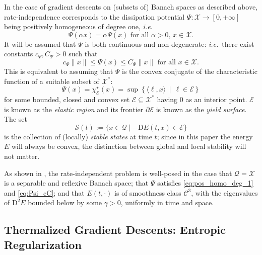 \documentclass[reqno]{amsart}
\theoremstyle{definition}
\begin{document}
In the case of gradient descents on (subsets of) Banach spaces as described above, rate-independence corresponds to the dissipation potential $\Psi \colon \mathcal{X} \to [0, +\infty]$ being positively homogeneous of degree one, \emph{i.e.}
\begin{equation}
	\label{eq:pos_homo_deg_1}
	\Psi(\alpha x) = \alpha \Psi(x) \text{ for all $\alpha > 0$, $x \in \mathcal{X}$.}
\end{equation}
It will be assumed that $\Psi$ is both continuous and non-degenerate:  \emph{i.e.}\ there exist constants $c_{\Psi}, C_{\Psi} > 0$ such that
\begin{equation}
	\label{eq:Psi_cC}
	c_{\Psi} \| x \| \leq \Psi(x) \leq C_{\Psi} \| x \| \text{ for all } x \in \mathcal{X}.
\end{equation}
This is equivalent to assuming that $\Psi$ is the convex conjugate of the characteristic function of a suitable subset of $\mathcal{X}^{\ast}$:
\begin{equation}
	\label{eq:DissElas}
	\Psi(x) = \chi_{\mathcal{E}}^{\star} (x) = \sup \left\{ \langle \ell, x \rangle \,\middle|\, \ell \in {\mathcal{E}} \right\}
\end{equation}
for some bounded, closed and convex set ${\mathcal{E}} \subseteq \mathcal{X}^{\ast}$ having $0$ as an interior point.  ${\mathcal{E}}$ is known as the \emph{elastic region} and its frontier $\partial {\mathcal{E}}$ is known as the \emph{yield surface}.  The set
\begin{equation}
	\label{eq:stable}
	{\mathcal{S}}(t) := \{ x \in \mathcal{Q} \mid - {\mathrm{D}} E(t, x) \in {\mathcal{E}} \}
\end{equation}
is the collection of (locally) \emph{stable states} at time $t$;  since in this paper the energy $E$ will always be convex, the distinction between global and local stability will not matter.

As shown in \cite[Theorem 7.1]{MielkeTheil:2004}, the rate-independent problem is well-posed in the case that $\mathcal{Q} = \mathcal{X}$ is a separable and reflexive Banach space;  that $\Psi$ satisfies \eqref{eq:pos_homo_deg_1} and \eqref{eq:Psi_cC};  and that $E(t, \cdot)$ is of smoothness class $\mathcal{C}^{3}$, with the eigenvalues of ${\mathrm{D}}^{2} E$ bounded below by some $\gamma > 0$, uniformly in time and space.

\subsection{Thermalized Gradient Descents: Entropic Regularization}
\end{document}

